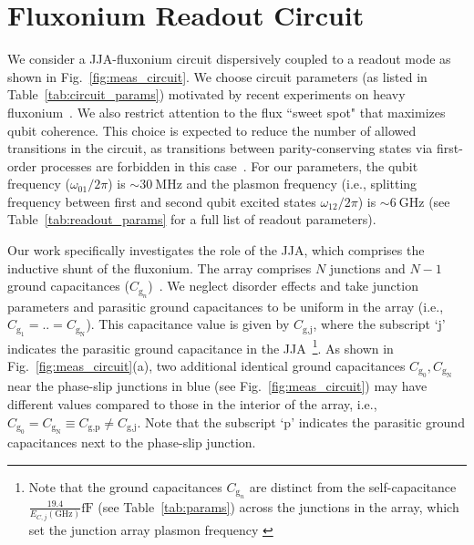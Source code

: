 \documentclass[%
reprint,
superscriptaddress,
 amsmath,amssymb,
 aps,
 prx,
longbibliography,
floatfix,
]{revtex4-2}
\begin{document}
\section{Fluxonium Readout Circuit}\label{sec:Fluxonium}


We consider a JJA-fluxonium circuit dispersively coupled to a readout mode as shown in Fig.~\ref{fig:meas_circuit}. We choose circuit parameters (as listed in Table~\ref{tab:circuit_params}) motivated by recent experiments on heavy fluxonium~\cite{zhang_tunable_2024,zhang_universal_2021, ding_high-fidelity_2023}. We also restrict attention to the flux ``sweet spot" that maximizes qubit coherence. This choice is expected to reduce the number of allowed transitions in the circuit, as transitions between parity-conserving states via first-order processes are forbidden in this case~\cite{zhu_circuit_2013}. For our parameters, the qubit frequency ($\omega_{01}/2\pi$) is $\sim 30 \ \mathrm{MHz}$ and the plasmon frequency (i.e., splitting frequency between first and second qubit excited states $\omega_{12}/2\pi$) is $\sim 6 \ \mathrm{GHz}$ (see Table~\ref{tab:readout_params} for a full list of readout parameters).
 

Our work specifically investigates the role of the JJA, which comprises the inductive shunt of the fluxonium. The array comprises $N$ junctions and $N-1$ ground capacitances ($C_{\textrm{g}_n}$)~\cite{manucharyan2009fluxonium}. We neglect disorder effects and take junction parameters and parasitic ground capacitances to be uniform in the array (i.e., $C_{\textrm{g}_1}=..=C_{\textrm{g}_\textrm{N}}$). This capacitance value is given by $C_\textrm{g,j}$, where the subscript `$\mathrm{j}$' indicates the parasitic ground capacitance in the JJA~\footnote{Note that the ground capacitances $C_{\textrm{g}_n}$ are distinct from the self-capacitance $\frac{19.4}{E_{C,j}(\mathrm{GHz})}\mathrm{fF}$ (see Table~\ref{tab:params}) across the junctions in the array, which set the junction array plasmon frequency \cite{catelani2011relaxation}}. As shown in Fig.~\ref{fig:meas_circuit}(a), two additional identical ground capacitances $C_{\textrm{g}_0}, C_{\textrm{g}_\textrm{N}}$ near the phase-slip junctions in blue (see Fig.~\ref{fig:meas_circuit}) may have different values compared to those in the interior of the array, i.e., $C_{\textrm{g}_0}=C_{\textrm{g}_\textrm{N}}\equiv C_\textrm{g,p}\neq C_\textrm{g,j}$. Note that the subscript `$\mathrm{p}$' indicates the parasitic ground capacitances next to the phase-slip junction.
\end{document}

